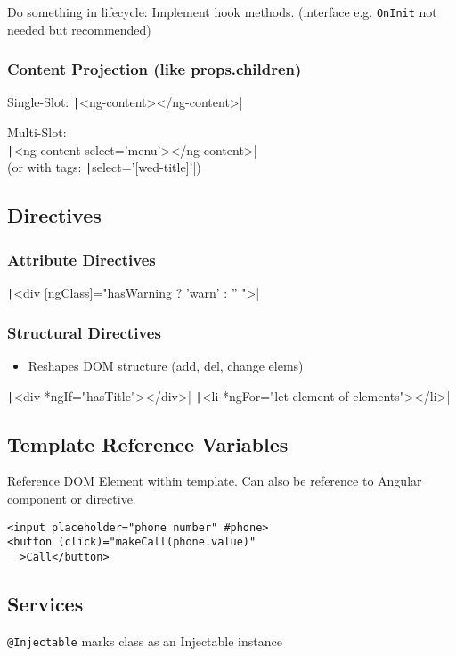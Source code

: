 \begin{multicols*}{4}
Do something in lifecycle: Implement hook methods. (interface e.g. \lstinline|OnInit| not needed but recommended)

\subsubsection{Content Projection (like props.children)}
Single-Slot: \texttt|<ng-content></ng-content>|

Multi-Slot:\\
\texttt|<ng-content select='menu'></ng-content>| \\
(or with tags: \texttt|select='[wed-title]'|)

\subsection{Directives}
\subsubsection{Attribute Directives}
\texttt|<div [ngClass]="hasWarning ? 'warn' : '' ">|
\subsubsection{Structural Directives}
\begin{itemize}
    \item Reshapes DOM structure (add, del, change elems)
\end{itemize}
\texttt|<div *ngIf="hasTitle"></div>|
\texttt|<li *ngFor="let element of elements"></li>|


\subsection{Template Reference Variables}
Reference DOM Element within template. Can also be reference to Angular component or directive.
\begin{verbatim}
<input placeholder="phone number" #phone>
<button (click)="makeCall(phone.value)"
  >Call</button>
\end{verbatim}

\subsection{Services}
\lstinline|@Injectable| marks class as an Injectable instance


\end{multicols*}
